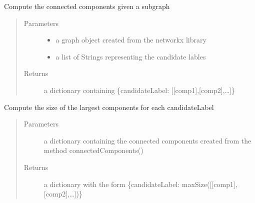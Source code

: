 \documentclass[letterpaper,10pt,english]{sphinxmanual}
\begin{document}
\begin{fulllineitems}
\label{\detokenize{refinement:refinement.labelRefinement.connectedComponents}}
Compute the connected components given a subgraph
\begin{quote}\begin{description}
\item[{Parameters}] \leavevmode\begin{itemize}
\item {} 
 \textendash{} a graph object created from the networkx library

\item {} 
 \textendash{} a list of Strings representing the candidate lables

\end{itemize}

\item[{Returns}] \leavevmode
a dictionary containing \{candidateLabel: {[}{[}comp1{]},{[}comp2{]},…{]}\}

\end{description}\end{quote}

\end{fulllineitems}


\begin{fulllineitems}
\label{\detokenize{refinement:refinement.labelRefinement.sizelargestComponent}}
Compute the size of the largest components for each candidateLabel
\begin{quote}\begin{description}
\item[{Parameters}] \leavevmode
{} \textendash{} a dictionary containing the connected components created from the method connectedComponents()

\item[{Returns}] \leavevmode
a dictionary with the form \{candidateLabel: maxSize({[}{[}comp1{]},{[}comp2{]},…{]})\}

\end{description}\end{quote}

\end{fulllineitems}
\end{document}
